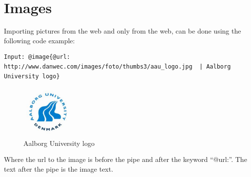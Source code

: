 \section{Images}
Importing pictures from the web and only from the web, can be done using the following code example:

\begin{lstlisting}[frame=single]
Input: @image{@url: http://www.danwec.com/images/foto/thumbs3/aau_logo.jpg  | Aalborg University logo}
\end{lstlisting}

\begin{figure}[! h]
\centering
	 \includegraphics[width=100px]{images/aau_logo.jpg}
		 \caption{Aalborg University logo}	
	\label{fig:Imageimport}
\end{figure}

Where the url to the image is before the pipe and after the keyword ``@url:''. The text after the pipe is the image text.